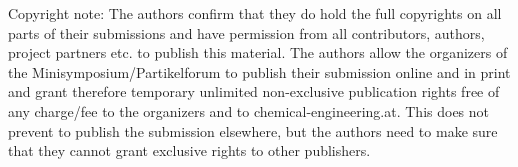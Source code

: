 Copyright note: The authors confirm that they do hold the full copyrights on all parts of their submissions and have permission from all contributors, authors, project partners etc. to publish this material.
The authors allow the organizers of the Minisymposium/Partikelforum to publish their submission online and in print and grant therefore temporary unlimited non-exclusive publication rights free of any charge/fee to the organizers and to chemical-engineering.at.
This does not prevent to publish the submission elsewhere, but the authors need to make sure that they cannot grant exclusive rights to other publishers.
